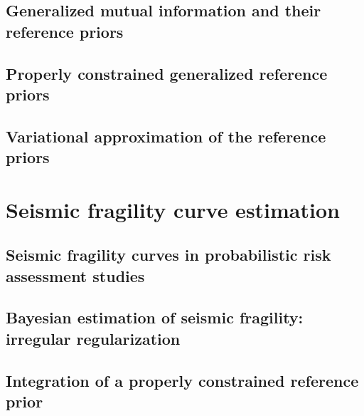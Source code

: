\documentclass[a4paper]{book}
\begin{document}


\chapter{Generalized mutual information and their reference priors}\label{chap:ref-generalized}




\chapter{Properly constrained generalized reference priors}\label{chap:constrained-prior}




\chapter{Variational approximation of the reference priors}\label{chap:varp}




\part{Seismic fragility curve estimation}\label{part:spra}


\chapter{Seismic fragility curves in probabilistic risk assessment studies}\label{chap:frags-intro}




\chapter{Bayesian estimation of seismic fragility: irregular regularization}\label{chap:prem}




\chapter{Integration of a properly constrained reference prior}\label{chap:constrained-frags}


\end{document}
